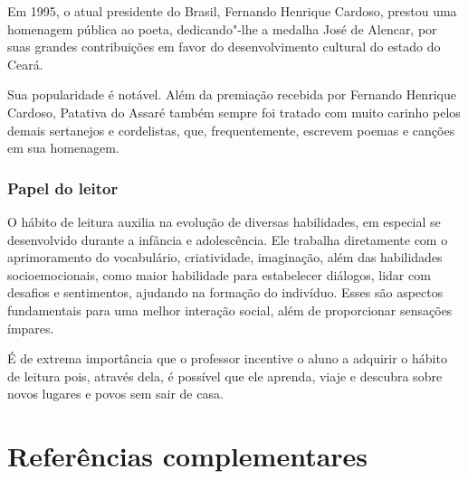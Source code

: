 \documentclass[12pt]{extarticle}
\begin{document}
Em 1995, o atual presidente do Brasil, Fernando Henrique Cardoso,
prestou uma homenagem pública ao poeta, dedicando"-lhe a medalha José de
Alencar, por suas grandes contribuições em favor do desenvolvimento
cultural do estado do Ceará.

Sua popularidade é notável. Além da premiação recebida por Fernando
Henrique Cardoso, Patativa do Assaré também sempre foi tratado com muito
carinho pelos demais sertanejos e cordelistas, que, frequentemente,
escrevem poemas e canções em sua homenagem.

\subsubsection{Papel do leitor}

O hábito de leitura auxilia na evolução de diversas habilidades, em
especial se desenvolvido durante a infância e adolescência. Ele trabalha
diretamente com o aprimoramento do vocabulário, criatividade,
imaginação, além das habilidades socioemocionais, como maior habilidade
para estabelecer diálogos, lidar com desafios e sentimentos, ajudando na
formação do indivíduo. Esses são aspectos fundamentais para uma melhor
interação social, além de proporcionar sensações ímpares.

É de extrema importância que o professor incentive o aluno a adquirir o
hábito de leitura pois, através dela, é possível que ele aprenda, viaje
e descubra sobre novos lugares e povos sem sair de casa.


\section{Referências complementares}
\end{document}
